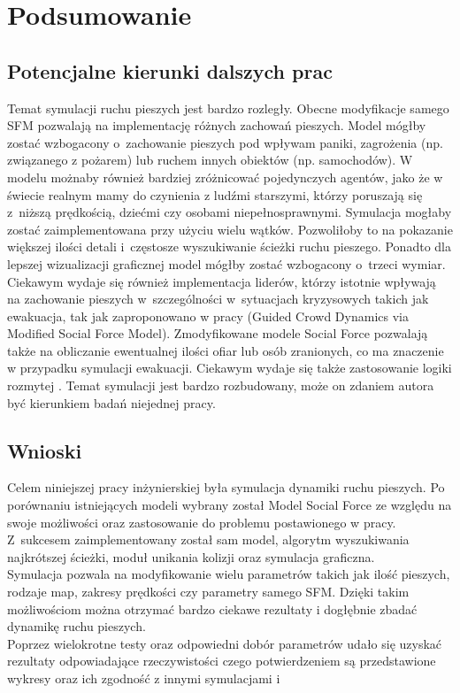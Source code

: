 \chapter{Podsumowanie}
\label{cha:podsumowanie}

\section{Potencjalne kierunki dalszych prac}
Temat symulacji ruchu pieszych jest bardzo rozległy. Obecne modyfikacje samego SFM pozwalają na implementację różnych zachowań pieszych. Model mógłby zostać wzbogacony o~zachowanie pieszych pod wpływam paniki, zagrożenia (np. związanego z pożarem) lub ruchem innych obiektów (np. samochodów). W modelu możnaby również bardziej zróżnicować pojedynczych agentów, jako że w świecie realnym mamy do czynienia z ludźmi starszymi, którzy poruszają się z~niższą prędkością, dziećmi czy osobami niepełnosprawnymi. Symulacja mogłaby zostać zaimplementowana przy użyciu wielu wątków. Pozwoliłoby to na pokazanie większej ilości detali i~częstosze wyszukiwanie ścieżki ruchu pieszego. Ponadto dla lepszej wizualizacji graficznej model mógłby zostać wzbogacony o~trzeci wymiar. Ciekawym wydaje się również implementacja liderów, którzy istotnie wpływają na zachowanie pieszych w~szczególności w~sytuacjach kryzysowych takich jak ewakuacja, tak jak zaproponowano w pracy (Guided Crowd Dynamics via Modified Social Force Model\cite{GuideCrowdDynViaModifiedSocialForceModel}). Zmodyfikowane modele Social Force pozwalają także na obliczanie ewentualnej ilości ofiar lub osób zranionych, co ma znaczenie w przypadku symulacji ewakuacji. 
Ciekawym wydaje się także zastosowanie logiki rozmytej \cite{modelingFuzzyLogic}.
Temat symulacji jest bardzo rozbudowany, może on zdaniem autora być kierunkiem badań niejednej pracy. 

\section{Wnioski}
\label{sec:wnioski}

Celem niniejszej pracy inżynierskiej była symulacja dynamiki ruchu pieszych. Po porównaniu istniejących modeli wybrany został Model Social Force ze względu na swoje możliwości oraz zastosowanie do problemu postawionego w pracy. Z~sukcesem zaimplementowany został sam model, algorytm wyszukiwania najkrótszej ścieżki, moduł unikania kolizji oraz symulacja graficzna.\\
Symulacja pozwala na modyfikowanie wielu parametrów takich jak ilość pieszych, rodzaje map, zakresy prędkości czy parametry samego SFM. Dzięki takim możliwościom można otrzymać bardzo ciekawe rezultaty i dogłębnie zbadać dynamikę ruchu pieszych.\\
Poprzez wielokrotne testy oraz odpowiedni dobór parametrów udało się uzyskać rezultaty odpowiadające rzeczywistości czego potwierdzeniem są przedstawione wykresy oraz ich zgodność z innymi symulacjami \cite{GuideCrowdDynViaModifiedSocialForceModel} i \cite{SocialForceSuwala}

